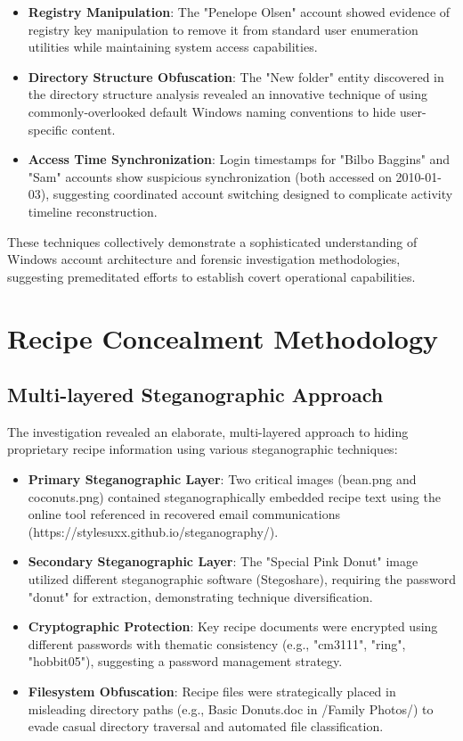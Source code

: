 \begin{itemize}
    \item \textbf{Registry Manipulation}: The "Penelope Olsen" account showed evidence of registry key manipulation to remove it from standard user enumeration utilities while maintaining system access capabilities.
    
    \item \textbf{Directory Structure Obfuscation}: The "New folder" entity discovered in the directory structure analysis revealed an innovative technique of using commonly-overlooked default Windows naming conventions to hide user-specific content.
    
    \item \textbf{Access Time Synchronization}: Login timestamps for "Bilbo Baggins" and "Sam" accounts show suspicious synchronization (both accessed on 2010-01-03), suggesting coordinated account switching designed to complicate activity timeline reconstruction.
\end{itemize}

These techniques collectively demonstrate a sophisticated understanding of Windows account architecture and forensic investigation methodologies, suggesting premeditated efforts to establish covert operational capabilities.

\section{Recipe Concealment Methodology}
\subsection{Multi-layered Steganographic Approach}
The investigation revealed an elaborate, multi-layered approach to hiding proprietary recipe information using various steganographic techniques:

\begin{itemize}
    \item \textbf{Primary Steganographic Layer}: Two critical images (bean.png and coconuts.png) contained steganographically embedded recipe text using the online tool referenced in recovered email communications (https://stylesuxx.github.io/steganography/).
    
    \item \textbf{Secondary Steganographic Layer}: The "Special Pink Donut" image utilized different steganographic software (Stegoshare), requiring the password "donut" for extraction, demonstrating technique diversification.
    
    \item \textbf{Cryptographic Protection}: Key recipe documents were encrypted using different passwords with thematic consistency (e.g., "cm3111", "ring", "hobbit05"), suggesting a password management strategy.
    
    \item \textbf{Filesystem Obfuscation}: Recipe files were strategically placed in misleading directory paths (e.g., Basic Donuts.doc in /Family Photos/) to evade casual directory traversal and automated file classification.
\end{itemize}

